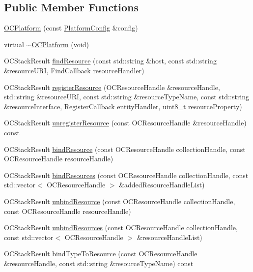\subsection*{Public Member Functions}
\begin{DoxyCompactItemize}
\item 
\hyperlink{classOC_1_1OCPlatform_a6a8fab4d7a96e6608b0be1312b131580}{O\+C\+Platform} (const \hyperlink{structOC_1_1PlatformConfig}{Platform\+Config} \&config)
\item 
virtual \hyperlink{classOC_1_1OCPlatform_a64a502e9c3efd151ad1e849e8678dcb6}{$\sim$\+O\+C\+Platform} (void)
\item 
O\+C\+Stack\+Result \hyperlink{classOC_1_1OCPlatform_a6c93e271dca1a61f237ebea4c795f208}{find\+Resource} (const std\+::string \&host, const std\+::string \&resource\+U\+R\+I, Find\+Callback resource\+Handler)
\item 
O\+C\+Stack\+Result \hyperlink{classOC_1_1OCPlatform_aa719897291b5e6668f026e2e4b861cab}{register\+Resource} (O\+C\+Resource\+Handle \&resource\+Handle, std\+::string \&resource\+U\+R\+I, const std\+::string \&resource\+Type\+Name, const std\+::string \&resource\+Interface, Register\+Callback entity\+Handler, uint8\+\_\+t resource\+Property)
\item 
O\+C\+Stack\+Result \hyperlink{classOC_1_1OCPlatform_ae42baa45cd2e70062b7582f8bbbdcc9a}{unregister\+Resource} (const O\+C\+Resource\+Handle \&resource\+Handle) const 
\item 
O\+C\+Stack\+Result \hyperlink{classOC_1_1OCPlatform_ac4594ddc58963001de33bff8072ff22f}{bind\+Resource} (const O\+C\+Resource\+Handle collection\+Handle, const O\+C\+Resource\+Handle resource\+Handle)
\item 
O\+C\+Stack\+Result \hyperlink{classOC_1_1OCPlatform_a59c5b855f03c7cdd89d64bd162978bd0}{bind\+Resources} (const O\+C\+Resource\+Handle collection\+Handle, const std\+::vector$<$ O\+C\+Resource\+Handle $>$ \&added\+Resource\+Handle\+List)
\item 
O\+C\+Stack\+Result \hyperlink{classOC_1_1OCPlatform_af5c0276b46cffef81efeb2738fb1bd98}{unbind\+Resource} (const O\+C\+Resource\+Handle collection\+Handle, const O\+C\+Resource\+Handle resource\+Handle)
\item 
O\+C\+Stack\+Result \hyperlink{classOC_1_1OCPlatform_ab292d40d546e7e5d6df1274237399dfc}{unbind\+Resources} (const O\+C\+Resource\+Handle collection\+Handle, const std\+::vector$<$ O\+C\+Resource\+Handle $>$ \&resource\+Handle\+List)
\item 
O\+C\+Stack\+Result \hyperlink{classOC_1_1OCPlatform_a3a7f2658df5b17be3641dd3646aa5af8}{bind\+Type\+To\+Resource} (const O\+C\+Resource\+Handle \&resource\+Handle, const std\+::string \&resource\+Type\+Name) const 

\end{DoxyCompactItemize}
